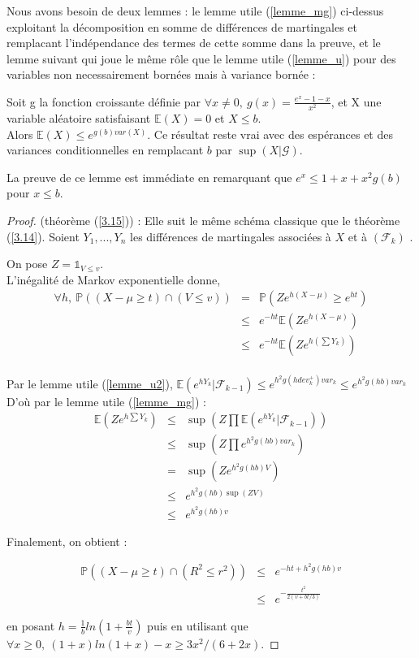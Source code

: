 Nous avons besoin de deux lemmes : le lemme utile (\ref{lemme_mg}) ci-dessus exploitant la décomposition en somme de différences de martingales et remplacant l'indépendance des termes de cette somme dans la preuve, et le lemme suivant qui joue le même rôle que le lemme utile (\ref{lemme_u}) pour des variables non necessairement bornées mais à variance bornée :

\begin{lemma}
\label{lemme_u2}
Soit g la fonction croissante définie par $\forall x \neq 0,~ g(x)=\frac{e^x-1-x}{x^2}$, et X une variable aléatoire satisfaisant $\mathbb{E}(X)=0$ et $X \leq b$. \\
Alors $\mathbb{E}(X) \leq e^{g(b)var(X)}$.
Ce résultat reste vrai avec des espérances et des variances conditionnelles en remplacant $b$ par $\sup(X|\mathcal{G})$.
\end{lemma}
La preuve de ce lemme est immédiate en remarquant que $e^x \leq 1+x+x^2g(b)$ pour $x \leq b$.

\begin{proof} (théorème (\ref{3.15})) :
Elle suit le même schéma classique que le théorème (\ref{3.14}).
Soient $Y_1,...,Y_n$ les différences de martingales associées à $X$ et à $(\mathcal{F}_k)$ .

On pose $  Z=\mathds{1}_{V \leq v}  $. \\
L'inégalité de Markov exponentielle donne,
 \begin{eqnarray*} \forall h, ~
\mathbb{P}((X-\mu \geq t)\cap(V \leq v)) 
 &=& \mathbb{P}(Ze^{h(X-\mu)} \geq e^{ht})\\
 &\leq& e^{-ht}\mathbb{E}(Ze^{h(X-\mu)})\\
 &\leq& e^{-ht}\mathbb{E}(Ze^{h(\sum Y_k)}) 
 \end{eqnarray*}
\\ 

Par le lemme utile (\ref{lemme_u2}), 
$ \mathbb{E}(e^{hY_k}|\mathcal{F}_{k-1}) \leq e^{h^2g(hdev_k^+)var_k} \leq e^{h^2g(hb)var_k} $ \\
D'où par le lemme utile (\ref{lemme_mg}) :
\begin{eqnarray*}
 \mathbb{E}(Ze^{h\sum Y_k}) &\leq& \sup(Z \prod \mathbb{E}(e^{hY_k}|\mathcal{F}_{k-1}))\\
& \leq & \sup(Z \prod e^{h^2g(hb)var_k})\\
&=&  \sup(Z e^{h^2g(hb)V})\\
&\leq& e^{h^2g(hb)\sup(ZV)}\\
&\leq& e^{h^2g(hb)v}
\end{eqnarray*}


Finalement, on obtient :

\begin{eqnarray*} \mathbb{P}((X-\mu \geq t)\cap(R^2 \leq r^2)) &\leq& e^{-ht+h^2g(hb)v}\\
&\leq&  e^{-\frac{t^2}{2(v+bt/3)}}
\end{eqnarray*}

en posant $h=\frac{1}{b}ln(1+\frac{bt}{v})$ puis en utilisant que $\forall x \geq 0,~ (1+x)ln(1+x)-x \geq 3x^2/(6+2x)$.

\end{proof}


